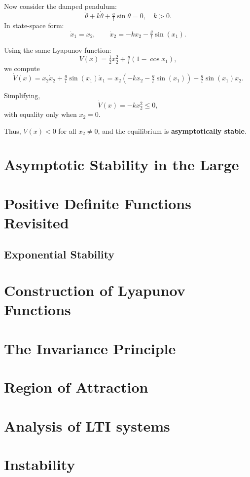 \begin{example}
Now consider the damped pendulum:
\[
    \ddot{\theta} + k\dot{\theta} + \tfrac{g}{l}\sin\theta = 0, \quad k>0.
\]
In state-space form:
\[
    \dot{x}_1 = x_2, 
    \qquad 
    \dot{x}_2 = -k x_2 - \tfrac{g}{l}\sin(x_1).
\]

Using the same Lyapunov function:
\[
    V(x) = \tfrac{1}{2}x_2^2 + \tfrac{g}{l}(1-\cos x_1),
\]
we compute
\[
    \dot V(x) = x_2\dot{x}_2 + \tfrac{g}{l}\sin(x_1)\dot{x}_1
    = x_2(-k x_2 - \tfrac{g}{l}\sin(x_1)) + \tfrac{g}{l}\sin(x_1)x_2.
\]

Simplifying,
\[
    \dot V(x) = -k x_2^2 \leq 0,
\]
with equality only when $x_2=0$.  

Thus, $\dot V(x)<0$ for all $x_2 \neq 0$, and the equilibrium is \textbf{asymptotically stable}.
\end{example}

\section{Asymptotic Stability in the Large}
\section{Positive Definite Functions Revisited} 
\subsection{Exponential Stability}
\section{Construction of Lyapunov Functions}
\section{The Invariance Principle}
\section{Region of Attraction}
\section{Analysis of LTI systems}
\section{Instability}